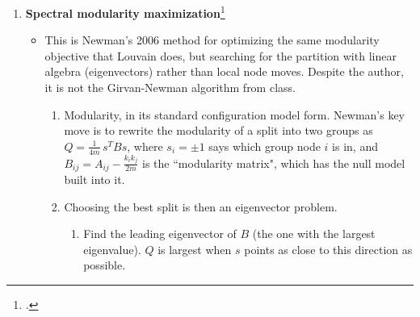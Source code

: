 \documentclass{article}
\newcommand{\nc}[1]{(#1)}
\begin{document}
\begin{enumerate}
\begin{itemize}
\begin{enumerate}
            \item Published in \textit{Scientific Reports} 2019, the authors are all affiliated with Leiden University in Holland. The authors come from applied mathematics, econometrics, and CS/data science respectively, however all are associated with the Centre for Science and Technology Studies complex systems and scientometrics (science-of-science) group. The authors and journal point to broad, interdisciplinary potential, and the Leiden algorithm has been implemented in many software packages and libraries. It has been cited over 6747 times. 
            \item It is built for very large, sparse (or ultra-sparse) graphs. On these applications, it can significantly out-perform Louvain while also reducing runtime greatly. Best application: need a good partition of a large network quickly. Does not guarantee in any way to be the optimum. Different runs can still be stuck in local maxima. Inherits issues of resolution limit if CPM is not used, although CPM comes with the added pressure of needing to chose a proper density to compare against. 
        \end{enumerate}
    \end{itemize}
    \item \textbf{Spectral modularity maximization}\footcite{newman2006modularity}
    \begin{itemize}
        \item This is Newman's 2006 method for optimizing the same modularity objective that Louvain does, but searching for the partition with linear algebra (eigenvectors) rather than local node moves. Despite the author, it is not the Girvan-Newman algorithm from class.
        \begin{enumerate}
            \item Modularity, in its standard configuration model form. Newman's key move is to rewrite the modularity of a split into two groups as $Q = \frac{1}{4m}\, s^T B s$, where $s_i = \pm 1$ says which group node $i$ is in, and $B_{ij} = A_{ij} - \frac{k_ik_j}{2m}$ is the ``modularity matrix", which has the null model built into it.
            \item Choosing the best split is then an eigenvector problem.
            \begin{enumerate}
                \item[\nc 1] Find the leading eigenvector of $B$ (the one with the largest eigenvalue). $Q$ is largest when $s$ points as close to this direction as possible.

\end{enumerate}
\end{enumerate}
\end{itemize}
\end{enumerate}
\end{document}
